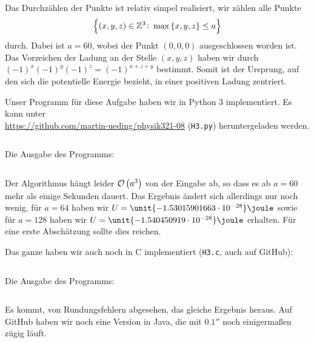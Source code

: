 \documentclass[11pt, ngerman, fleqn]{article}
\newcommand{\e}[1]{\cdot 10^{#1}}
\begin{document}
Das Durchzählen der Punkte ist relativ simpel realisiert, wir zählen alle
Punkte \[ \set{(x, y, z)\in \mathbb Z^3 \colon \max\set{x, y, z} \leq a} \]
durch. Dabei ist $a = 60$, wobei der Punkt $(0, 0, 0)$ ausgeschlossen worden
ist. Das Vorzeichen der Ladung an der Stelle $(x, y, z)$ haben wir durch
$(-1)^x (-1)^y (-1)^z = (-1)^{x+z+y}$ bestimmt. Somit ist der Ursprung, auf den
sich die potentielle Energie bezieht, in einer positiven Ladung zentriert.

Unser Programm für diese Aufgabe haben wir in Python 3 implementiert. Es kann
unter \\ \url{https://github.com/martin-ueding/physik321-08} (\texttt{H3.py})
heruntergeladen werden.

\inputminted[fontsize=\small, frame=lines, linenos]{python}{H3.py}

Die Ausgabe des Programms:

\inputminted[fontsize=\small, frame=lines]{text}{H3.py.txt}

Der Algorithmus hängt leider $\mathcal O\del{a^3}$ von der Eingabe ab, so dass
es ab $a = 60$ mehr als einige Sekunden dauert. Das Ergebnis ändert sich
allerdings nur noch wenig, für $a = 64$ haben wir $U =
\unit{-1.53015901663\e{-28}}\joule$ sowie für $a = 128$ haben wir $U =
\unit{-1.540450919\e{-28}}\joule$ erhalten. Für eine erste Abschätzung sollte
dies reichen.

Das ganze haben wir auch noch in C implementiert (\texttt{H3.c}, auch auf
GitHub):

\inputminted[fontsize=\small, frame=lines, linenos, tabsize=4]{c}{H3.c}

Die Ausgabe des Programms:

\inputminted[fontsize=\small, frame=lines]{text}{H3.c.txt}

Es kommt, von Rundungsfehlern abgesehen, das gleiche Ergebnis heraus. Auf
GitHub haben wir noch eine Version in Java, die mit $\unit{0.1}\second$ noch
einigermaßen zügig läuft.

%
%
\end{document}

